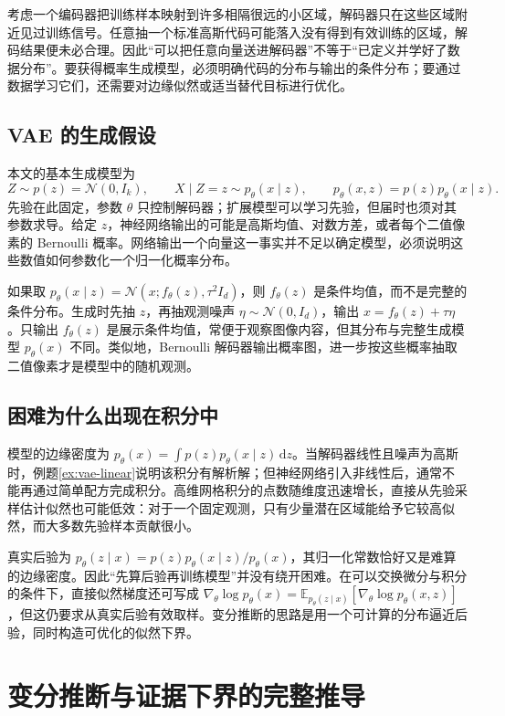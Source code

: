 \documentclass[UTF8,12pt,a4paper,fontset=fandol]{ctexart}
\begin{document}
考虑一个编码器把训练样本映射到许多相隔很远的小区域，解码器只在这些区域附近见过训练信号。任意抽一个标准高斯代码可能落入没有得到有效训练的区域，解码结果便未必合理。因此“可以把任意向量送进解码器”不等于“已定义并学好了数据分布”。要获得概率生成模型，必须明确代码的分布与输出的条件分布；要通过数据学习它们，还需要对边缘似然或适当替代目标进行优化。

\subsection{VAE 的生成假设}
本文的基本生成模型为
\begin{equation}
 Z\sim p(z)=\mathcal N(0,I_k),\qquad
 X\mid Z=z\sim p_\theta(x\mid z),\qquad
 p_\theta(x,z)=p(z)p_\theta(x\mid z).
 \label{eq:vae-joint}
\end{equation}
先验在此固定，参数 $\theta$ 只控制解码器；扩展模型可以学习先验，但届时也须对其参数求导。给定 $z$，神经网络输出的可能是高斯均值、对数方差，或者每个二值像素的 Bernoulli 概率。网络输出一个向量这一事实并不足以确定模型，必须说明这些数值如何参数化一个归一化概率分布。

如果取 $p_\theta(x\mid z)=\mathcal N(x;f_\theta(z),\tau^2I_d)$，则 $f_\theta(z)$ 是条件均值，而不是完整的条件分布。生成时先抽 $z$，再抽观测噪声 $\eta\sim\mathcal N(0,I_d)$，输出 $x=f_\theta(z)+\tau\eta$。只输出 $f_\theta(z)$ 是展示条件均值，常便于观察图像内容，但其分布与完整生成模型 $p_\theta(x)$ 不同。类似地，Bernoulli 解码器输出概率图，进一步按这些概率抽取二值像素才是模型中的随机观测。

\subsection{困难为什么出现在积分中}
模型的边缘密度为 $p_\theta(x)=\int p(z)p_\theta(x\mid z)\,\mathrm dz$。当解码器线性且噪声为高斯时，例题\ref{ex:vae-linear}说明该积分有解析解；但神经网络引入非线性后，通常不能再通过简单配方完成积分。高维网格积分的点数随维度迅速增长，直接从先验采样估计似然也可能低效：对于一个固定观测，只有少量潜在区域能给予它较高似然，而大多数先验样本贡献很小。

真实后验为 $p_\theta(z\mid x)=p(z)p_\theta(x\mid z)/p_\theta(x)$，其归一化常数恰好又是难算的边缘密度。因此“先算后验再训练模型”并没有绕开困难。在可以交换微分与积分的条件下，直接似然梯度还可写成 $\nabla_\theta\log p_\theta(x)=\mathbb E_{p_\theta(z\mid x)}[\nabla_\theta\log p_\theta(x,z)]$，但这仍要求从真实后验有效取样。变分推断的思路是用一个可计算的分布逼近后验，同时构造可优化的似然下界。

\section{变分推断与证据下界的完整推导}
\label{sec:vae-elbo}
\end{document}
